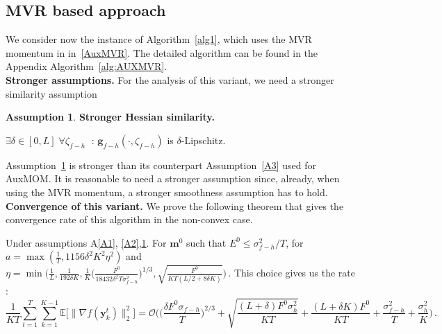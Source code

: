 \documentclass[10pt]{article} %
\theoremstyle{plain}
\theoremstyle{definition}
\newtheorem{assumption}[theorem]{Assumption}
\theoremstyle{remark}
\newcommand{\norm}[1]{\|#1\|_2}
\def\vg{{\bm{g}}}
\def\vm{{\bm{m}}}
\def\vy{{\bm{y}}}
\newcommand{\E}{\mathbb{E}}
\begin{document}
\subsection{MVR based approach}
We consider now the instance of Algorithm~\ref{alg1}, which uses the MVR momentum in in~\eqref{AuxMVR}. The detailed algorithm can be found in the Appendix Algorithm~\ref{alg:AUXMVR}.\\
\textbf{Stronger assumptions.} For the analysis of this variant, we need a stronger similarity assumption
\begin{assumption}\label{A3'}
\textbf{Stronger Hessian similarity.}
\begin{center}
    $\exists\delta \in [0,L] \;\forall \zeta_{f-h} \;$ :\; $\vg_{f-h}(\cdot,\zeta_{f-h})$ is $\delta$-Lipschitz.
\end{center}
\end{assumption}
Assumption~\ref{A3'} is stronger than its counterpart Assumption~\ref{A3} used for AuxMOM. It is reasonable to need a stronger assumption since, already, when using the MVR momentum, a stronger smoothness assumption has to hold.
\\
\textbf{Convergence of this variant.}
We prove the following theorem that gives the convergence rate of this algorithm in the non-convex case.
\vspace{1mm}\begin{framedtheorem}\label{MVR}
Under assumptions A\ref{A1}, \ref{A2},\ref{A3'}. For $\vm^0$ such that $E^0\leq \sigma_{f-h}^2/T$, for $a =\max(\frac{1}{T}, 1156 \delta^2 K^2\eta^2)$  and 
$\eta = \min\Big(\frac{1}{L},\frac{1}{192\delta K}, \frac{1}{K}\Big(\frac{F^0}{18432\delta^2T\sigma_{f-h}^2}\Big)^{1/3},\sqrt{\frac{F^0}{KT(L/2 + 8\delta K)}}\Big)\, .$
This choice gives us the rate :
$$\frac{1}{KT}\sum_{t=1}^T\sum_{k=1}^{K-1} \E\big[\norm{\nabla f(\vy^t_{k})}^2\big] = \mathcal{O}\Big( \big(\frac{\delta F^0\sigma_{f-h}}{T}\big)^{2/3} + \sqrt{\frac{(L + \delta )F^0\sigma_{h}^2}{KT}} +  \frac{(L + \delta K)F^0}{KT} + \frac{\sigma_{f-h}^2}{T} + \frac{\sigma_h^2}{K}\Big)\, .$$
\end{framedtheorem}
\end{document}
